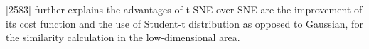 \textcite{maaten2008visualizing}[2583] further explains the advantages of t-SNE over SNE are the improvement of its cost function and the use of Student-t distribution as opposed to Gaussian, for the similarity calculation in the low-dimensional area.










 

